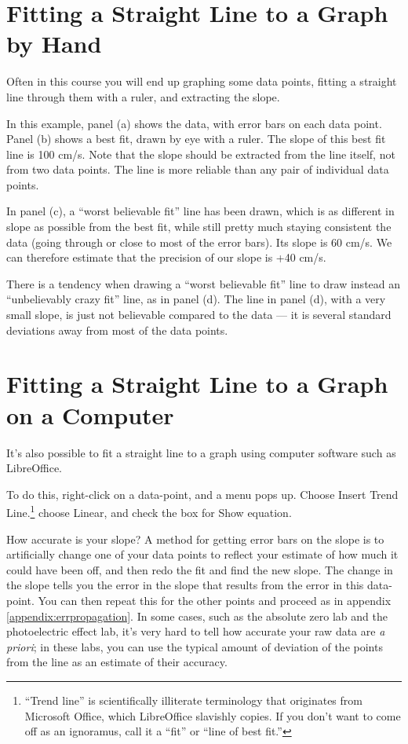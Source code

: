 \section{Fitting a Straight Line to a Graph by Hand}

Often in this course you will end up graphing some data
points, fitting a straight line through them with a ruler,
and extracting the slope.


In this example, panel (a) shows the data, with error bars
on each data point. Panel (b) shows a best fit, drawn by eye
with a ruler. The slope of this best fit line is 100 cm/s.
Note that the slope should be extracted from the line
itself, not from two data points. The line is more reliable
than any pair of individual data points.

In panel (c), a ``worst believable fit'' line has been
drawn, which is as different in slope as possible from the
best fit, while still pretty much staying consistent the
data (going through or close to most of the error bars). Its
slope is 60 cm/s. We can therefore estimate that the
precision of our slope is +40 cm/s.

There is a tendency when drawing a ``worst believable fit''
line to draw instead an ``unbelievably crazy fit'' line, as
in panel (d). The line in panel (d), with a very small
slope, is just not believable compared to the data --- it is
several standard deviations away from most of the data points.

\section{Fitting a Straight Line to a Graph on a Computer}
It's also possible to fit a straight line to a graph using computer
software such as LibreOffice. 

To do this, right-click on a data-point, and a menu pops up. 
Choose Insert Trend Line.\footnote{``Trend line'' is scientifically illiterate terminology
that originates from Microsoft Office, which LibreOffice slavishly copies. If you
don't want to come off as an ignoramus, call it a ``fit'' or ``line of best fit.''
} choose Linear, and check the box for Show equation.

How accurate is your slope? A method for getting error bars on the slope
is to artificially change one of your data
points to reflect your estimate of how much it could have been off,
and then redo the fit and find the new slope. The change in the slope
tells you the error in the slope that results from the error in this
data-point. You can then repeat this for the other points and
proceed as in appendix \ref{appendix:errpropagation}. In some cases, such as the absolute zero
lab and the photoelectric effect lab, it's very hard to tell how accurate
your raw data are \emph{a priori}; in these labs, you can use the typical
amount of deviation of the points from the line as an estimate of their
accuracy.

